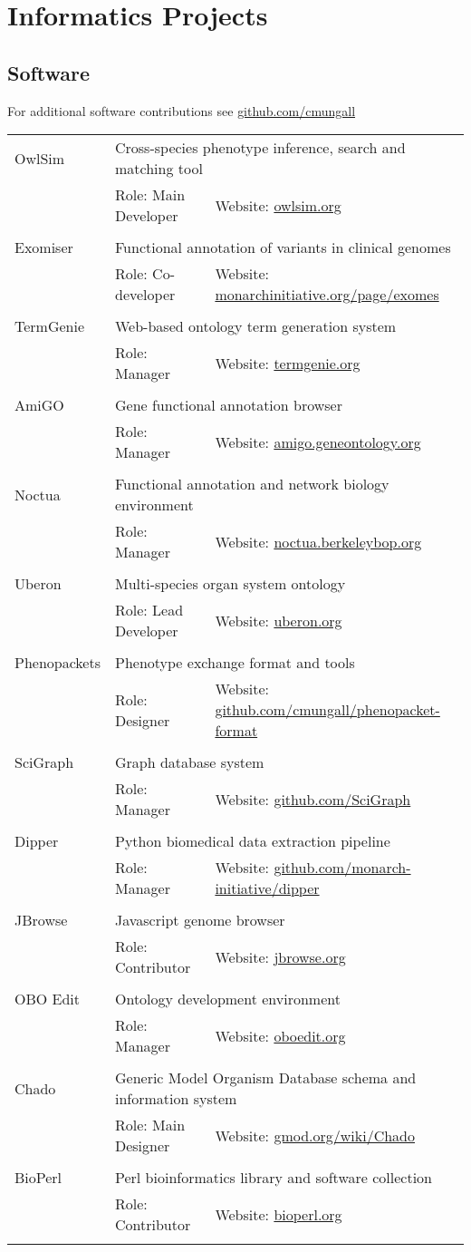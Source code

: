 \newcommand{\pinfo}[4]{
  #1 & \multicolumn{2}{l}{#2} \\
     & Role: #4 & Website: \href{http://#3}{#3} \\
 \\
}


\section*{Informatics Projects}

\subsection*{Software}

For additional software contributions see \href{http://github.com/cmungall}{github.com/cmungall}

\begin{longtable}{p{1in} p{4in} p{2in}}

    \pinfo{OwlSim}{Cross-species phenotype inference, search and matching tool}{owlsim.org}{Main Developer}
    \pinfo{Exomiser}{Functional annotation of variants in clinical genomes}{monarchinitiative.org/page/exomes}{Co-developer}
    \pinfo{TermGenie}{Web-based ontology term generation system}{termgenie.org}{Manager}
    \pinfo{AmiGO}{Gene functional annotation browser}{amigo.geneontology.org}{Manager}
    \pinfo{Noctua}{Functional annotation and network biology environment}{noctua.berkeleybop.org}{Manager}
    \pinfo{Uberon}{Multi-species organ system ontology}{uberon.org}{Lead Developer}
    \pinfo{Phenopackets}{Phenotype exchange format and tools}{github.com/cmungall/phenopacket-format}{Designer}
    \pinfo{SciGraph}{Graph database system}{github.com/SciGraph}{Manager}
    \pinfo{Dipper}{Python biomedical data extraction pipeline}{github.com/monarch-initiative/dipper}{Manager}
    \pinfo{JBrowse}{Javascript genome browser}{jbrowse.org}{Contributor}
    \pinfo{OBO Edit}{Ontology development environment}{oboedit.org}{Manager}
    \pinfo{Chado}{Generic Model Organism Database schema and information system}{gmod.org/wiki/Chado}{Main Designer}
    \pinfo{BioPerl}{Perl bioinformatics library and software collection}{bioperl.org}{Contributor}

\end{longtable}

